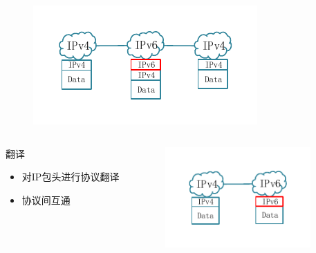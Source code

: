 \documentclass{beamer}
\begin{document}
\begin{frame}
\begin{columns}[T]
\begin{column}{.49\textwidth}
      \vspace{-2em}
      \begin{figure}
        \includegraphics[width=\textwidth]{figs/17-encapsulation.pdf}
      \end{figure}
      \vspace{-2em}
    \end{column}
  \end{columns}
  \vspace{1em}
  \begin{columns}[T]
    \begin{column}{.4\textwidth}
      \begin{block}{翻译}
        \begin{itemize}
        \item 对IP包头进行协议翻译
        \item 协议间互通
        \end{itemize}
      \end{block}
    \end{column}
    \hfill
    \begin{column}{.49\textwidth}
      \vspace{-3em}
      \begin{figure}
        \includegraphics[width=0.9\textwidth]{figs/18-xlat.pdf}
      \end{figure}
    \end{column}
  \end{columns}
\end{frame}
\end{document}

